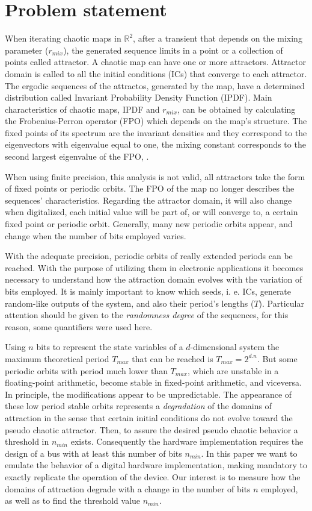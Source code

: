 \section{Problem statement} \label{sec:estudio}

When iterating chaotic maps in $\mathbb{R}^2$, after a transient that depends on the mixing parameter ($r_{mix}$), the generated sequence limits in a point or a collection of points called attractor. A chaotic map can have one or more attractors. Attractor domain is called to all the initial conditions (ICs) that converge to each attractor. The ergodic sequences of the attractos, generated by the map, have a determined distribution called Invariant Probability Density Function (IPDF). Main characteristics of chaotic maps, IPDF and $r_{mix}$, can be obtained by calculating the Frobenius-Perron operator (FPO) which depends on the map's structure. The fixed points of its spectrum are the invariant densities and they correspond to the eigenvectors with eigenvalue equal to one, the mixing constant corresponds to the second largest eigenvalue of the FPO, \cite{Lasota1994,Lasota1973}.

When using finite precision, this analysis is not valid, all attractors take the form of fixed points or periodic orbits. The FPO of the map no longer describes the sequences' characteristics. Regarding the attractor domain, it will also change when digitalized, each initial value will be part of, or will converge to, a certain fixed point or periodic orbit. Generally, many new periodic orbits appear, and change when the number of bits employed varies.

With the adequate precision, periodic orbits of really extended periods can be reached. With the purpose of utilizing them in electronic applications it becomes necessary to understand how the attraction domain evolves with the variation of bits employed. It is mainly important to know which seeds, i. e. ICs, generate random-like outputs of the system, and also their period's lengths ($T$). Particular attention should be given to the \textsl{randomness degree} of the sequences, for this reason, some quantifiers were used here.

Using $n$ bits to represent the state variables of a $d$-dimensional system the maximum theoretical period $T_{max}$ that can be
reached is $T_{max}=2^{d.n}$. But some periodic orbits with period much lower than $T_{max}$, which are unstable in a floating-point arithmetic, become stable in fixed-point arithmetic, and viceversa. In principle, the modifications appear to be unpredictable.
The appearance of these low period stable orbits represents a \textsl{degradation} of the domains of attraction in the sense that certain initial conditions do not evolve toward the pseudo chaotic attractor. Then, to assure the desired pseudo chaotic behavior a threshold in $n_{min}$  exists. Consequently the hardware implementation requires the design of a
bus with at least this number of bits $n_{min}$. 
In this paper we want to emulate the behavior of a digital hardware implementation, making mandatory to 
exactly replicate the operation of the device. Our interest is
to measure how the domains of attraction degrade with a change in
the number of bits $n$ employed, as well as to find the threshold value 
$n_{min}$. 
